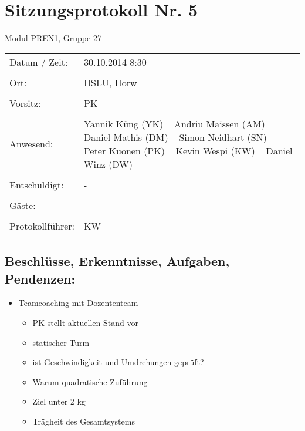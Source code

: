 \documentclass[a4paper,10pt,fleqn]{article}
\begin{document}
\section*{Sitzungsprotokoll Nr. 5}
Modul PREN1, Gruppe 27

\begin{longtable}[l]{@{}p{}@{}p{}@{}}
    Datum / Zeit: &
        30.10.2014 8:30
        \\\\
    Ort: &
        HSLU, Horw
        \\\\
    Vorsitz: &
        PK
        \\\\
    Anwesend: &
        Yannik Küng (YK) ~
        Andriu Maissen (AM) ~
        Daniel Mathis (DM) ~
        Simon Neidhart (SN) ~
        Peter Kuonen (PK) ~
        Kevin Wespi (KW) ~
        Daniel Winz (DW) ~
        \\\\
    Entschuldigt: &
        - ~
        \\\\
    Gäste: &
        - ~
        \\\\
    Protokollführer: &
        KW
        \\
\end{longtable}
%
\subsection*{Beschlüsse, Erkenntnisse, Aufgaben, Pendenzen:}
\begin{itemize}
    \item Teamcoaching mit Dozententeam
    \begin{itemize}
        \item PK stellt aktuellen Stand vor
        \item statischer Turm
        \item ist Geschwindigkeit und Umdrehungen geprüft?
        \item Warum quadratische Zuführung
        \item Ziel unter 2 kg
        \item Trägheit des Gesamtsystems
    \end{itemize}
\end{itemize}
%
\end{document}
